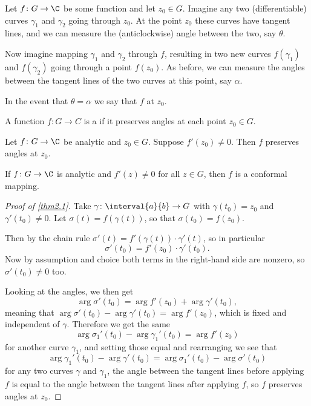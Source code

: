 


Let $f \colon G \to \C$ be some function and let $z_0 \in G$.
Imagine any two (differentiable) curves $\gamma_1$ and $\gamma_2$ going through $z_0$.
At the point $z_0$ these curves have tangent lines, and we can measure the (anticlockwise) angle between the two, say $\theta$.

Now imagine mapping $\gamma_1$ and $\gamma_2$ through $f$, resulting in two new curves $f(\gamma_1)$ and $f(\gamma_2)$ going through a point $f(z_0)$.
As before, we can measure the angles between the tangent lines of the two curves at this point, say $\alpha$.

In the event that $\theta = \alpha$ we say that $f$  at $z_0$.

\begin{definition}
	A function $f \colon G \to C$ is a  if it preserves angles at each point $z_0 \in G$.
\end{definition}

\begin{theorem}\label{thm2.1}
	Let $f \colon G \to \C$ be analytic and $z_0 \in G$.
	Suppose $f'(z_0) \neq 0$.
	Then $f$ preserves angles at $z_0$.
\end{theorem}

\begin{corollary}\label{cor2.2}
	If $f \colon G \to \C$ is analytic and $f'(z) \neq 0$ for all $z \in G$, then $f$ is a conformal mapping.
\end{corollary}

\begin{proof}[Proof of \autoref{thm2.1}]
	Take $\gamma \colon \interval{a}{b} \to G$ with $\gamma(t_0) = z_0$ and $\gamma'(t_0) \neq 0$.
	Let $\sigma(t) = f(\gamma(t))$, so that $\sigma(t_0) = f(z_0)$.

	Then by the chain rule $\sigma'(t) = f'(\gamma(t)) \cdot \gamma'(t)$, so in particular
	\[
		\sigma'(t_0) = f'(z_0) \cdot \gamma'(t_0).
	\]
	Now by assumption and choice both terms in the right-hand side are nonzero, so $\sigma'(t_0) \neq 0$ too.

	Looking at the angles, we then get
	\[
		\arg \sigma'(t_0) = \arg f'(z_0) + \arg \gamma'(t_0),
	\]
	meaning that $\arg \sigma'(t_0) - \arg \gamma'(t_0) = \arg f'(z_0)$, which is fixed and independent of $\gamma$.
	Therefore we get the same
	\[
		\arg \sigma_1'(t_0) - \arg \gamma_1'(t_0) = \arg f'(z_0)
	\]
	for another curve $\gamma_1$, and setting those equal and rearranging we see that
	\[
		\arg \gamma_1'(t_0) - \arg \gamma'(t_0) = \arg \sigma_1'(t_0) - \arg \sigma'(t_0)
	\]
	for any two curves $\gamma$ and $\gamma_1$, the angle between the tangent lines before applying $f$ is equal to the angle between the tangent lines after applying $f$, so $f$ preserves angles at $z_0$.
\end{proof}

